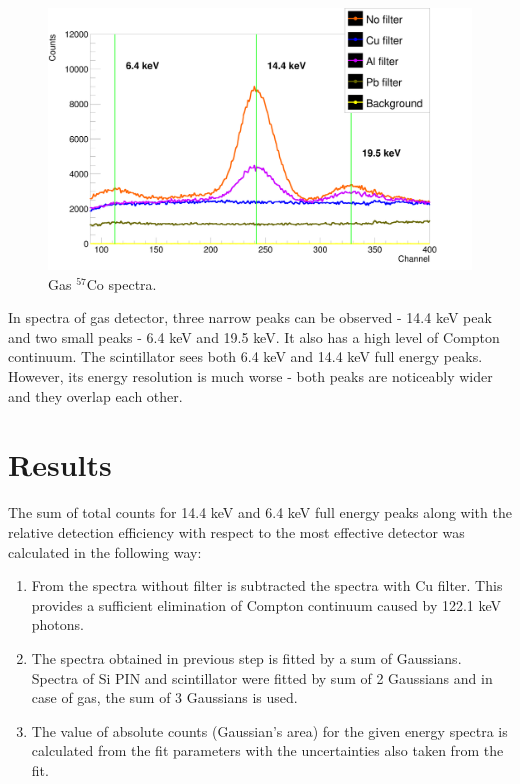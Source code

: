 \begin{figure}[H]
\centering
\includegraphics[scale=0.125, angle = 0]{./pictures/GasSpectre.png}
\caption{Gas $^{57}$Co spectra.}
\label{Gas detector spectra.}

\end{figure}


In spectra of gas detector, three narrow peaks can be observed - 14.4 keV peak and two small peaks - 6.4 keV and 19.5 keV. It also has a high level of Compton continuum.
The scintillator sees both 6.4 keV and 14.4 keV full energy peaks. However, its energy resolution is much worse - both peaks are noticeably wider and they overlap each other. 

\section{Results}
The sum of total counts for 14.4 keV and 6.4 keV full energy peaks along with the relative detection efficiency with respect to the most effective detector was calculated in the following way:

\begin{enumerate}
\item From the spectra without filter is subtracted the spectra with Cu filter. This provides a sufficient elimination of Compton continuum caused by 122.1 keV photons. 
\item The spectra obtained in previous step is fitted by a sum of Gaussians. Spectra of Si PIN and scintillator were fitted by sum of 2 Gaussians and in case of gas, the sum of 3 Gaussians is used.
\item The value of absolute counts (Gaussian's area) for the given energy spectra is calculated from the fit parameters with the uncertainties also taken from the fit.
\end{enumerate}




